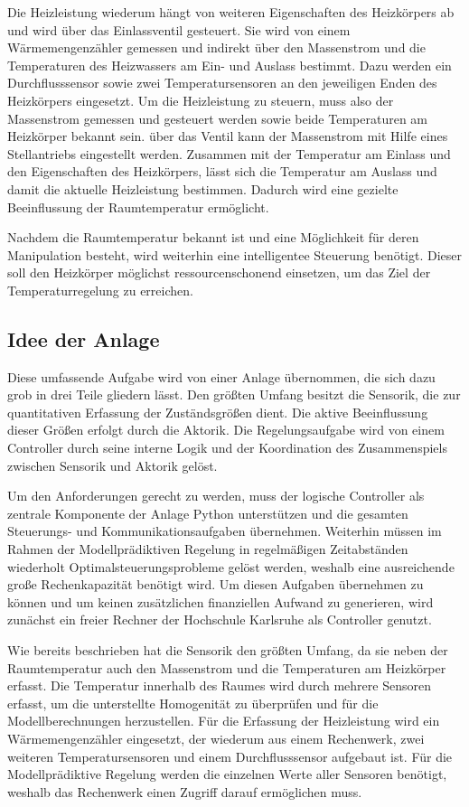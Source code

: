 Die Heizleistung wiederum hängt von weiteren Eigenschaften des Heizkörpers ab und wird über das Einlassventil gesteuert. Sie wird von einem Wärmemengenzähler gemessen und indirekt über den Massenstrom und die Temperaturen des Heizwassers am Ein- und Auslass bestimmt. Dazu werden ein Durchflusssensor sowie zwei Temperatursensoren an den jeweiligen Enden des Heizkörpers eingesetzt. Um die Heizleistung zu steuern, muss also der Massenstrom gemessen und gesteuert werden sowie beide Temperaturen am Heizkörper bekannt sein. über das Ventil kann der Massenstrom mit Hilfe eines Stellantriebs eingestellt werden. Zusammen mit der Temperatur am Einlass und den Eigenschaften des Heizkörpers, lässt sich die Temperatur am Auslass und damit die aktuelle Heizleistung bestimmen. Dadurch wird eine gezielte Beeinflussung der Raumtemperatur ermöglicht.

Nachdem die Raumtemperatur bekannt ist und eine Möglichkeit für deren Manipulation besteht, wird weiterhin eine intelligentee Steuerung benötigt. Dieser soll den Heizkörper möglichst ressourcenschonend einsetzen, um das Ziel der Temperaturregelung zu erreichen.

\subsection{Idee der Anlage}
\label{sub:idee}

Diese umfassende Aufgabe wird von einer Anlage übernommen, die sich dazu grob in drei Teile gliedern lässt. Den größten Umfang besitzt die Sensorik, die zur quantitativen Erfassung der Zuständsgrößen dient. Die aktive Beeinflussung dieser Größen erfolgt durch die Aktorik. Die Regelungsaufgabe wird von einem Controller durch seine interne Logik und der Koordination des Zusammenspiels zwischen Sensorik und Aktorik gelöst.

Um den Anforderungen gerecht zu werden, muss der logische Controller als zentrale Komponente der Anlage Python unterstützen und die gesamten Steuerungs- und Kommunikationsaufgaben übernehmen. Weiterhin müssen im Rahmen der Modellprädiktiven Regelung in regelmäßigen Zeitabständen wiederholt Optimalsteuerungsprobleme gelöst werden, weshalb eine ausreichende große Rechenkapazität benötigt wird. Um diesen Aufgaben übernehmen zu können und um keinen zusätzlichen finanziellen Aufwand zu generieren, wird zunächst ein freier Rechner der Hochschule Karlsruhe als Controller genutzt.  

Wie bereits beschrieben hat die Sensorik den größten Umfang, da sie neben der Raumtemperatur auch den Massenstrom und die Temperaturen am Heizkörper erfasst. Die Temperatur innerhalb des Raumes wird durch mehrere Sensoren erfasst, um die unterstellte Homogenität zu überprüfen und für die Modellberechnungen herzustellen. Für die Erfassung der Heizleistung wird ein Wärmemengenzähler eingesetzt, der wiederum aus einem Rechenwerk, zwei weiteren Temperatursensoren und einem Durchflusssensor aufgebaut ist. Für die Modellprädiktive Regelung werden die einzelnen Werte aller Sensoren benötigt, weshalb das Rechenwerk einen Zugriff darauf ermöglichen muss.

